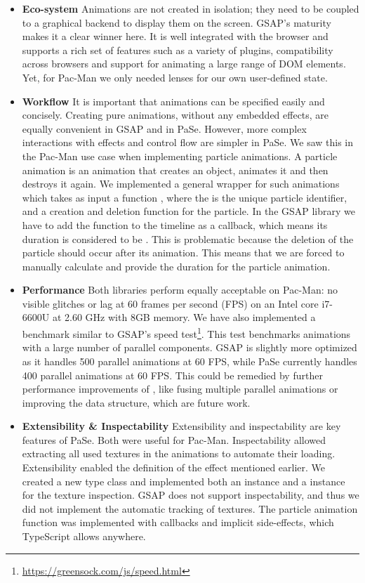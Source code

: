 \begin{itemize}
\item \textbf{Eco-system} Animations are not created in isolation; they need to
be coupled to a graphical backend to display them on the screen.  GSAP's maturity
makes it a clear winner here. It 
is well integrated with the browser and supports a rich set of features
such as a variety of plugins, compatibility across browsers and support for
animating a large range of DOM elements. Yet, for Pac-Man we only needed
lenses for our own user-defined state.
\item \textbf{Workflow} It is important that animations can
be specified easily and concisely. Creating pure animations, without
any embedded effects, are equally convenient in GSAP and in PaSe. However, more
complex interactions with effects and control flow are simpler in PaSe. We
saw this in the Pac-Man use case when implementing particle animations.
A particle animation is an animation that creates an object, animates it
and then destroys it again. We
implemented a general wrapper for such animations which takes as input a
function , where the  is the unique particle
identifier, and a creation and deletion function for the particle. In the GSAP
library we have to add the function to the timeline as a callback, which
means its duration is considered to be . This is problematic
because the deletion of
the particle should occur after its animation. This means that we are
forced to manually calculate and provide the duration for the particle
animation.
\item \textbf{Performance} Both libraries perform 
equally acceptable on Pac-Man: no visible glitches or lag at 60
frames per second (FPS) on an Intel core i7-6600U at 2.60 GHz with 8GB memory. We have also implemented a benchmark similar to GSAP's
speed test\footnote{\url{https://greensock.com/js/speed.html}}. This test
benchmarks animations with a large number of parallel components. GSAP is
slightly more optimized as it handles 500 parallel animations at 60 FPS, while
PaSe currently handles 400 parallel animations at 60 FPS.
This could be remedied by further performance improvements of \dsl{},
like fusing multiple parallel animations or improving the  data structure, which are future work.
\item \textbf{Extensibility \& Inspectability} Extensibility and inspectability
are key features of PaSe. Both were useful for Pac-Man. Inspectability allowed 
extracting all used textures in the animations to
automate their loading. Extensibility enabled the definition of the 
effect mentioned earlier. We
created a new  type class and implemented both an
 instance and a  instance for the texture inspection.
GSAP does not support inspectability, and thus we did not
implement the automatic tracking of textures. The particle animation function
was implemented with callbacks and implicit side-effects, which TypeScript allows anywhere.
\end{itemize}
